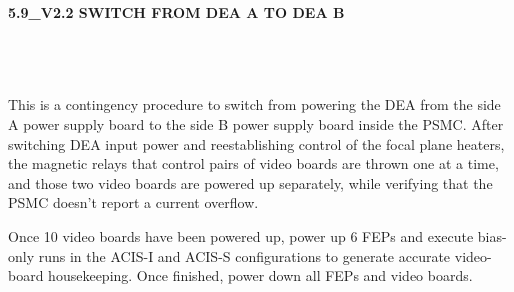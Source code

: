 \documentclass[11pt]{article}
\begin{document}
\newcommand{\be}{\begin{enumerate}}
\newcommand{\ee}{\end{enumerate}}
\newcommand{\bc}{\begin{center}}
\newcommand{\ec}{\end{center}}
\newcommand{\bi}{\begin{itemize}}
\newcommand{\ei}{\end{itemize}}
\newcommand{\bd}{\begin{description}}
\newcommand{\ed}{\end{description}}
\newcommand{\bt}{\begin{tabbing}}
\newcommand{\et}{\end{tabbing}}
\newcommand{\eg}{{\it e.g.~}}
\newcommand{\ie}{{\it i.e.~}}
\newcommand{\ul}{\underline}
\newcommand{\axaf}{{\em AXAF}}
\def\la{\hbox{\rlap{$<$}\lower0.5ex\hbox{$\sim$}\ }}

\centerline{\large {\bf 5.9\_V2.2 SWITCH FROM DEA A TO DEA B }}
\vspace{0.25in}

\\
 \\


\\

This is a contingency procedure to switch from powering the DEA 
from the side A power supply board to the side B power supply board inside 
the PSMC. After switching DEA input power and reestablishing control of the
focal plane heaters, the magnetic relays that control pairs of video boards 
are thrown one at a time, and those two video boards are powered up separately,
while verifying that the PSMC doesn't report a current overflow.

Once 10 video boards have been powered up, power up 6 FEPs and execute bias-only 
runs in the ACIS-I and ACIS-S configurations to generate accurate video-board 
housekeeping. Once finished, power down all FEPs and video boards.

\vspace{0.15in}
\end{document}
